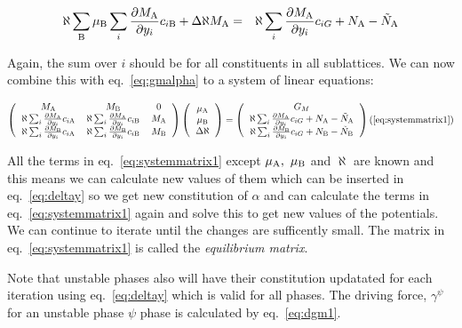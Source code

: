 \documentclass[12pt]{article}
\begin{document}
\begin{eqnarray}
\aleph \sum_{\rm B} \mu_{\rm B}
\sum_i \frac{\partial M_{\rm A}}{\partial y_i} c_{i{\rm B}}+
\Delta \aleph M_{\rm A} &=&
\aleph \sum_i \frac{\partial M_{\rm A}}{\partial y_i} c_{iG} + N_{\rm A}-\tilde N_{\rm A}
\label{eq:diffN2}
\end{eqnarray}

Again, the sum over $i$ should be for all constituents in all
sublattices.  We can now combine this with eq.~\ref{eq:gmalpha} to a
system of linear equations:

\label{eq:systemmatrix1}

\[
\left(
\begin{tabular}{ccc}
$M_{\rm A}$ & $M_{\rm B}$ & 0  \\
$\aleph \sum_i \frac{\partial M_{\rm A}}{\partial y_i} c_{i{\rm A}}$ &
$\aleph \sum_i \frac{\partial M_{\rm A}}{\partial y_i} c_{i{\rm B}}$ &
$M_{\rm A}$\\
$\aleph \sum_i \frac{\partial M_{\rm B}}{\partial y_i} c_{i{\rm A}}$ &
$\aleph \sum_i \frac{\partial M_{\rm B}}{\partial y_i} c_{i{\rm B}}$ &
$M_{\rm B}$
\end{tabular}
\right)
\left(
\begin{tabular}{c}
$\mu_{\rm A}$\\
$\mu_{\rm B}$\\
$\Delta \aleph$
\end{tabular}
\right)
=
\left(
\begin{tabular}{c}
$G_M$\\
$\aleph \sum_i \frac{\partial M_{\rm A}}{\partial y_i} c_{iG}+N_{\rm A}-\tilde N_{\rm A}$\\
$\aleph \sum_i \frac{\partial M_{\rm B}}{\partial y_i} c_{iG}+N_{\rm B}-\tilde N_{\rm B}$\\
\end{tabular}
\right)
\\ (\ref{eq:systemmatrix1})
\]

All the terms in eq.~\ref{eq:systemmatrix1} except $\mu_{\rm A},
~\mu_{\rm B}$ and $\aleph$ are known and this means we can calculate
new values of them which can be inserted in eq.~\ref{eq:deltay} so we
get new constitution of $\alpha$ and can calculate the terms in
eq.~\ref{eq:systemmatrix1} again and solve this to get new values of
the potentials.  We can continue to iterate until the changes are
sufficently small.  The matrix in eq.~\ref{eq:systemmatrix1} is called
the {\em equilibrium matrix}.

Note that unstable phases also will have their constitution updatated
for each iteration using eq.~\ref{eq:deltay} which is valid for all
phases.  The driving force, $\gamma^{\psi}$ for an unstable phase
$\psi$ phase is calculated by eq.~\ref{eq:dgm1}.
\end{document}
